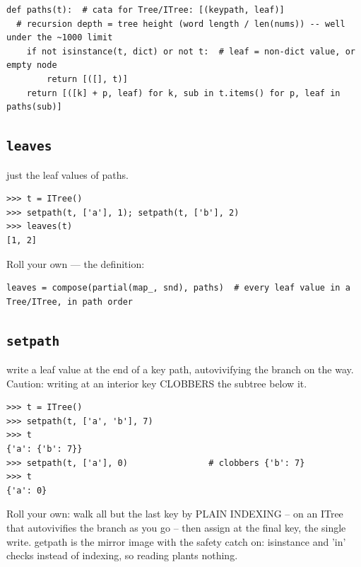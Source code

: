 \documentclass[10pt,letterpaper]{book}
\begin{document}
\begin{lstlisting}[style=ex]
def paths(t):  # cata for Tree/ITree: [(keypath, leaf)]
  # recursion depth = tree height (word length / len(nums)) -- well under the ~1000 limit
    if not isinstance(t, dict) or not t:  # leaf = non-dict value, or empty node
        return [([], t)]
    return [([k] + p, leaf) for k, sub in t.items() for p, leaf in paths(sub)]
\end{lstlisting}

\subsection{\texttt{leaves}}\label{def:leaves}
just the leaf values of paths.
\begin{lstlisting}[style=ex]
>>> t = ITree()
>>> setpath(t, ['a'], 1); setpath(t, ['b'], 2)
>>> leaves(t)
[1, 2]
\end{lstlisting}

Roll your own --- the definition:

\begin{lstlisting}[style=ex]
leaves = compose(partial(map_, snd), paths)  # every leaf value in a Tree/ITree, in path order
\end{lstlisting}

\subsection{\texttt{setpath}}\label{def:setpath}
write a leaf value at the end of a key path, autovivifying the branch on the way. Caution: writing at an interior key CLOBBERS the subtree below it.
\begin{lstlisting}[style=ex]
>>> t = ITree()
>>> setpath(t, ['a', 'b'], 7)
>>> t
{'a': {'b': 7}}
>>> setpath(t, ['a'], 0)                # clobbers {'b': 7}
>>> t
{'a': 0}
\end{lstlisting}

Roll your own: walk all but the last key by PLAIN INDEXING -- on an ITree that autovivifies the branch as you go -- then assign at the final key, the single write. getpath is the mirror image with the safety catch on: isinstance and 'in' checks instead of indexing, so reading plants nothing.
\end{document}
